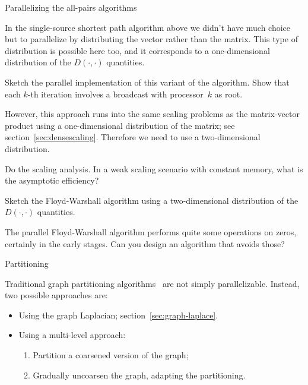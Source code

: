  {Parallelizing the all-pairs algorithms}

In the single-source shortest path algorithm above we didn't have much
choice but to parallelize by distributing the vector rather than the
matrix.  This type of distribution is possible here too, and it
corresponds to a one-dimensional distribution of the $D(\cdot,\cdot)$
quantities.
\begin{exercise}
  Sketch the parallel implementation of this variant of the
  algorithm. Show that each $k$-th iteration involves a broadcast with
  processor~$k$ as root.
\end{exercise}
However, this approach runs into the same scaling problems as the
matrix-vector product using a one-dimensional distribution of the
matrix; see section~\ref{sec:densescaling}. Therefore we need to use a
two-dimensional distribution.
\begin{exercise}
  Do the scaling analysis. In a weak scaling scenario with constant memory, 
  what is the asymptotic efficiency?
\end{exercise}
\begin{exercise}
  Sketch the Floyd-Warshall algorithm using a two-dimensional
  distribution of the $D(\cdot,\cdot)$ quantities.
\end{exercise}
\begin{exercise}
  The parallel Floyd-Warshall algorithm performs quite some operations
  on zeros, certainly in the early stages. Can you design an algorithm
  that avoids those?
\end{exercise}


 {Partitioning}

Traditional graph partitioning algorithms~\cite{LiTa:separator} are
not simply parallelizable. Instead, two possible approaches are:
\begin{itemize}
\item Using the graph Laplacian; section~\ref{sec:graph-laplace}.
\item Using a multi-level approach:
  \begin{enumerate}
  \item Partition a coarsened version of the graph;
  \item Gradually uncoarsen the graph, adapting the partitioning.
  \end{enumerate}
\end{itemize}

